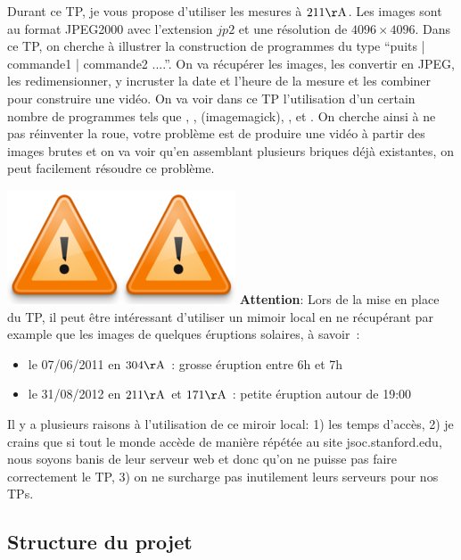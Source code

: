 Durant ce TP, je vous propose d'utiliser les mesures à $211 \si{\AA}$. Les images sont au format JPEG2000 avec l'extension $jp2$ et une résolution de $4096 \times 4096$. Dans ce TP, on cherche à illustrer la construction de programmes du type ``puits | commande1 | commande2 ....''. On va récupérer les images, les convertir en JPEG, les redimensionner, y incruster la date et l'heure de la mesure et les combiner pour construire une vidéo. On va voir dans ce TP l'utilisation d'un certain nombre de programmes tels que \bashcmd, \wget, \convert (imagemagick), \gawk, \sed et \ffmpeg. On cherche ainsi à ne pas réinventer la roue, votre problème est de produire une vidéo à partir des images brutes et on va voir qu'en assemblant plusieurs briques déjà existantes, on peut facilement résoudre ce problème.

\begin{center}
\colorbox{lblue}{\begin{minipage}{\linewidth}
\includegraphics[width=0.05\columnwidth]{Figs/warning.png}\includegraphics[width=0.05\columnwidth]{Figs/warning.png}
\textbf{Attention}: Lors de la mise en place du TP, il peut être intéressant d'utiliser un mimoir local en ne récupérant par example que les images de quelques éruptions solaires, à savoir~:
\begin{itemize}
\item le 07/06/2011 en $304\si{\AA}$ : grosse éruption entre 6h et 7h
\item le 31/08/2012 en $211\si{\AA}$ et $171\si{\AA}$ : petite éruption autour de 19:00
\end{itemize}
Il y a plusieurs raisons à l'utilisation de ce miroir local: 1) les temps d'accès, 2) je crains que si tout le monde accède de manière répétée au site jsoc.stanford.edu, nous soyons banis de leur serveur web et donc qu'on ne puisse pas faire correctement le TP, 3) on ne surcharge pas inutilement leurs serveurs pour nos TPs.
\end{minipage}}
\end{center}


\subsection{Structure du projet}

